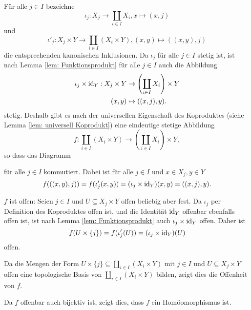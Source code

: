 \documentclass[a4paper,10pt]{article}
\begin{document}
Für alle $j \in I$ bezeichne
\[
 \iota_j: X_j \to \coprod_{i \in I} X_i, x \mapsto (x,j)
\]
und
\[
 \iota'_j : X_j \times Y \to \coprod_{i \in I}(X_i \times Y), (x,y) \mapsto ((x,y),j)
\]
die entsprechenden kanonischen Inklusionen. Da $\iota_j$ für alle $j \in I$ stetig ist, ist nach Lemma \ref{lem: Funktionsprodukt} für alle $j \in I$ auch die Abbildung
\begin{align*}
 \iota_j \times \operatorname{id}_Y:
 X_j \times Y &\to \left(\coprod_{i \in I} X_i\right) \times Y \\
 (x,y) &\mapsto ((x,j),y).
\end{align*}
stetig. Deshalb gibt es nach der universellen Eigenschaft des Koproduktes (siehe Lemma \ref{lem: universell Koprodukt}) eine eindeutige stetige Abbildung
\[
 f: \coprod_{i \in I} \left( X_i \times Y \right) \to \left( \coprod_{i \in I} X_i \right) \times Y,
\]
so dass das Diagramm
\begin{center}
\end{center}
für alle $j \in I$ kommutiert. Dabei ist für alle $j \in I$ und $x \in X_j, y \in Y$
\[
 f( ((x,y),j) )
 = f( \iota_j'(x,y) )
 = (\iota_j \times \operatorname{id}_Y)(x,y)
 = ((x,j),y).
\]

$f$ ist offen: Seien $j \in I$ und $U \subseteq X_j \times Y$ offen beliebig aber fest. Da $\iota_j$ per Definition des Koproduktes offen ist, und die Identität $\operatorname{id}_Y$ offenbar ebenfalls offen ist, ist nach Lemma \ref{lem: Funktionsprodukt} auch $\iota_j \times \operatorname{id}_Y$ offen. Daher ist
\[
 f(U \times \{j\})
 = f(\iota_j'(U))
 = (\iota_j \times \operatorname{id}_Y)(U)
\]
offen.

Da die Mengen der Form $U \times \{j\} \subseteq \coprod_{i \in I} (X_i \times Y)$ mit $j \in I$ und $U \subseteq X_j \times Y$ offen eine topologische Basis von $\coprod_{i \in I}(X_i \times Y)$ bilden, zeigt dies die Offenheit von $f$.

Da $f$ offenbar auch bijektiv ist, zeigt dies, dass $f$ ein Homöomorphismus ist.
\end{document}

